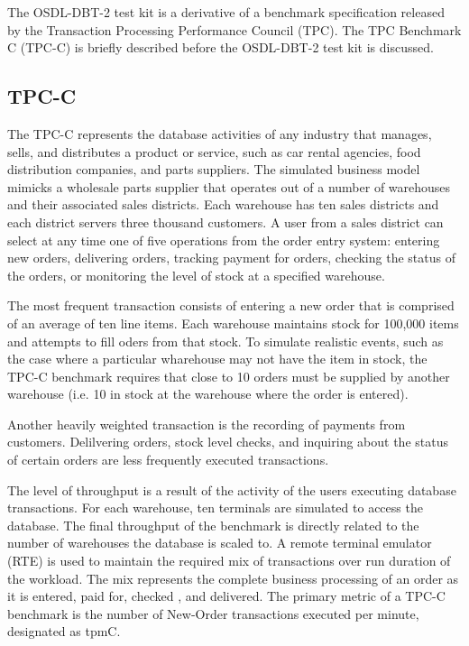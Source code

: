 \documentclass{article}
\begin{document}
The OSDL-DBT-2 test kit is a derivative of a benchmark specification released
by the Transaction Processing Performance Council (TPC).  The TPC Benchmark C
(TPC-C) is briefly described before the OSDL-DBT-2 test kit is discussed.

\subsection{TPC-C}

The TPC-C represents the database activities of any industry that manages,
sells, and distributes a product or service, such as car rental agencies,
food distribution companies, and parts suppliers.  The simulated business
model mimicks a wholesale parts supplier that operates out of a number of
warehouses and their associated sales districts. Each warehouse has ten sales
districts and each district servers three thousand customers.  A user from a
sales district can select at any time one of five operations from the order
entry system:  entering new orders, delivering orders, tracking payment for
orders, checking the status of the orders, or monitoring the level of stock
at a specified warehouse.

The most frequent transaction consists of entering a new order that is
comprised of an average of ten line items.  Each warehouse maintains stock
for 100,000 items  and attempts to fill oders from that stock.  To simulate
realistic events, such as the case where a particular wharehouse may not have
the item in stock, the TPC-C benchmark requires that close to 10%
orders must be supplied by another warehouse (i.e. 10%
in stock at the warehouse where the order is entered).

Another heavily weighted transaction is the recording of payments from
customers.  Delilvering orders, stock level checks, and inquiring about the
status of certain orders are less frequently executed transactions.

The level of throughput is a result of the activity of the users executing
database transactions.  For each warehouse, ten terminals are simulated to
access the database.  The final throughput of the benchmark is directly
related to the number of warehouses the database is scaled to.  A remote
terminal emulator (RTE) is used to maintain the required mix of transactions
over run duration of the workload.  The mix represents the complete business
processing of an order as it is entered, paid for, checked , and delivered.
The primary metric of a TPC-C benchmark is the number of New-Order
transactions executed per minute, designated as tpmC.
\end{document}
